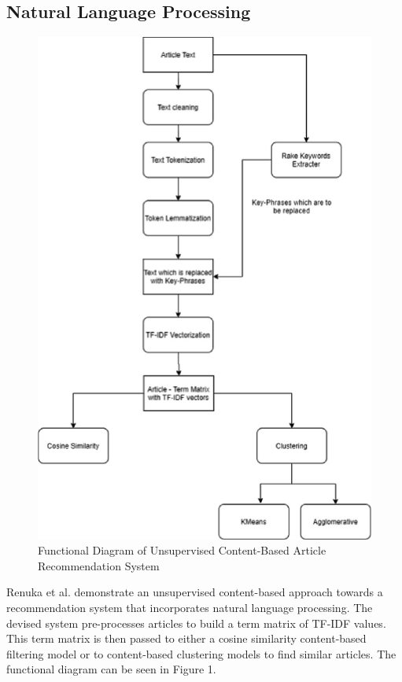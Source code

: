 \documentclass[sigconf]{acmart}
\begin{document}
\subsection{Natural Language Processing}
\begin{figure}[h]
  \centering
  \includegraphics[width=\linewidth]{article-rs}
  \caption{Functional Diagram of Unsupervised Content-Based Article Recommendation System \cite{RSArticle}}
\end{figure}
Renuka et al. \cite{RSArticle} demonstrate an unsupervised content-based approach towards a recommendation system that incorporates natural language processing. The devised system pre-processes articles to build a term matrix of TF-IDF values. This term matrix is then passed to either a cosine similarity content-based filtering model or to content-based clustering models to find similar articles. The functional diagram can be seen in Figure 1.
\end{document}
